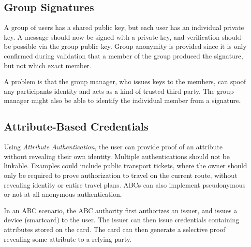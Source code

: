 \subsection{Group Signatures}
A group of users has a shared public key, but each user has an individual
private key. A message should now be signed with a private key, and verification
should be possible via the group public key. Group anonymity is provided since
it is only confirmed during validation that a member of the group produced the
signature, but not which exact member.

A problem is that the group manager, who issues keys to the members, can spoof
any participants identity and acts as a kind of trusted third party. The group
manager might also be able to identify the individual member from a signature.

\subsection{Attribute-Based Credentials}
Using \emph{Attribute Authentication}, the user can provide proof of an
attribute without revealing their own identity. Multiple authentications should
not be linkable. Examples could include public transport tickets, where the
owner should only be required to prove authorization to travel on the current
route, without revealing identity or entire travel plans. ABCs can also
implement pseudonymous or not-at-all-anonymous authentication.

In an ABC scenario, the ABC authority first authorizes an issuer, and issues a
device (smartcard) to the user. The issuer can then issue credentials containing
attributes stored on the card. The card can then generate a selective proof
revealing some attribute to a relying party.
